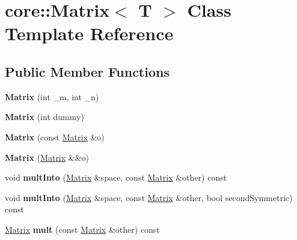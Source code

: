 \hypertarget{classcore_1_1_matrix}{}\section{core\+:\+:Matrix$<$ T $>$ Class Template Reference}
\label{classcore_1_1_matrix}
\subsection*{Public Member Functions}
\begin{DoxyCompactItemize}
\item 
\mbox{\label{classcore_1_1_matrix_ae28b1ab3cc1a648f777a76c76242663c}} 
{\bfseries Matrix} (int \+\_\+m, int \+\_\+n)
\item 
\mbox{\label{classcore_1_1_matrix_a3f02c579bc272fc7257d0209a08e4f71}} 
{\bfseries Matrix} (int dummy)
\item 
\mbox{\label{classcore_1_1_matrix_a26b11ae48366202abdcfec19b94ca710}} 
{\bfseries Matrix} (const \mbox{\hyperlink{classcore_1_1_matrix}{Matrix}} \&o)
\item 
\mbox{\label{classcore_1_1_matrix_ab67783e37f22c264e3cf27f407ea3fed}} 
{\bfseries Matrix} (\mbox{\hyperlink{classcore_1_1_matrix}{Matrix}} \&\&o)
\item 
\mbox{\label{classcore_1_1_matrix_ab0fa7ab1e930fddbb6a7b4d60d390343}} 
void {\bfseries mult\+Into} (\mbox{\hyperlink{classcore_1_1_matrix}{Matrix}} \&space, const \mbox{\hyperlink{classcore_1_1_matrix}{Matrix}} \&other) const
\item 
\mbox{\label{classcore_1_1_matrix_a101b4850cdee657d35b3249008329e85}} 
void {\bfseries mult\+Into} (\mbox{\hyperlink{classcore_1_1_matrix}{Matrix}} \&space, const \mbox{\hyperlink{classcore_1_1_matrix}{Matrix}} \&other, bool second\+Symmetric) const
\item 
\mbox{\label{classcore_1_1_matrix_a81c059a8ff83fef44cea83ba9b4e7707}} 
\mbox{\hyperlink{classcore_1_1_matrix}{Matrix}} {\bfseries mult} (const \mbox{\hyperlink{classcore_1_1_matrix}{Matrix}} \&other) const

\end{DoxyCompactItemize}
